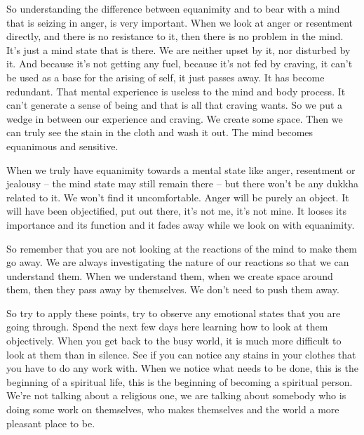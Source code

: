\documentclass[letterpaper,10pt,english]{sphinxmanual}
\begin{document}
\sphinxAtStartPar
So understanding the difference between equanimity and to bear with
a mind that is seizing in anger, is very important. When we look at anger or
resentment directly, and there is no resistance to it, then there is no problem
in the mind. It’s just a mind state that is there. We are neither upset by it, nor
disturbed by it. And because it’s not getting any fuel, because it’s not fed by
craving, it can’t be used as a base for the arising of self, it just passes away.
It has become redundant. That mental experience is useless to the mind and
body process. It can’t generate a sense of being and that is all that craving
wants. So we put a wedge in between our experience and craving. We create
some space. Then we can truly see the stain in the cloth and wash it out. The
mind becomes equanimous and sensitive.

\sphinxAtStartPar
When  we  truly  have  equanimity  towards  a  mental  state  like  anger,
resentment or jealousy – the mind state may still remain there – but there
won’t  be  any  dukkha  related  to  it. We  won’t  find  it  uncomfortable. Anger
will be purely an object. It will have been objectified, put out there, it’s not
me, it’s not mine. It looses its importance and its function and it fades away
while we look on with equanimity.

\sphinxAtStartPar
So remember that you are not looking at the reactions of the mind to
make them go away. We are always investigating the nature of our reactions
so that we can understand them. When we understand them, when we create
  space around them, then they pass away by themselves. We don’t need to
push them away.

\sphinxAtStartPar
So try to apply these points, try to observe any emotional states that
you are going through. Spend the next few days here learning how to look
at them objectively. When you get back to the busy world, it is much more
difficult to look at them than in silence. See if you can notice any stains in
your clothes that you have to do any work with. When we notice what needs
to be done, this is the beginning of a spiritual life, this is the beginning of
becoming a spiritual person. We’re not talking about a religious one, we are
talking about somebody who is doing some work on themselves, who makes
themselves and the world a more pleasant place to be.
\end{document}
